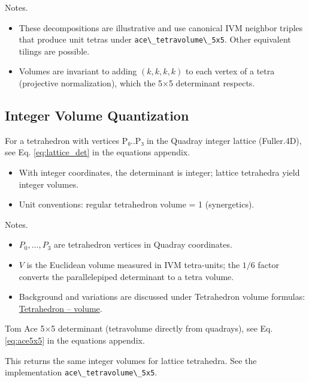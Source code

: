 \documentclass[
  10pt,
]{article}
\newcommand{\passthrough}[1]{#1}
\providecommand{\tightlist}{%
  \setlength{\itemsep}{0pt}\setlength{\parskip}{0pt}}
\begin{document}
Notes.

\begin{itemize}
\tightlist
\item
  These decompositions are illustrative and use canonical IVM neighbor
  triples that produce unit tetras under
  \passthrough{\lstinline!ace\_tetravolume\_5x5!}. Other equivalent
  tilings are possible.
\item
  Volumes are invariant to adding \((k,k,k,k)\) to each vertex of a
  tetra (projective normalization), which the 5×5 determinant respects.
\end{itemize}

\hypertarget{sec:integer_volume}{%
\subsection{Integer Volume Quantization}\label{sec:integer_volume}}

For a tetrahedron with vertices P₀..P₃ in the Quadray integer lattice
(Fuller.4D), see Eq. \eqref{eq:lattice_det} in the equations appendix.

\begin{itemize}
\tightlist
\item
  With integer coordinates, the determinant is integer; lattice
  tetrahedra yield integer volumes.
\item
  Unit conventions: regular tetrahedron volume = 1 (synergetics).
\end{itemize}

Notes.

\begin{itemize}
\tightlist
\item
  \(P_0,\ldots,P_3\) are tetrahedron vertices in Quadray coordinates.
\item
  \(V\) is the Euclidean volume measured in IVM tetra-units; the \(1/6\)
  factor converts the parallelepiped determinant to a tetra volume.
\item
  Background and variations are discussed under Tetrahedron volume
  formulas:
  \href{https://en.wikipedia.org/wiki/Tetrahedron\#Volume}{Tetrahedron
  -- volume}.
\end{itemize}

Tom Ace 5×5 determinant (tetravolume directly from quadrays), see Eq.
\eqref{eq:ace5x5} in the equations appendix.

This returns the same integer volumes for lattice tetrahedra. See the
implementation \passthrough{\lstinline!ace\_tetravolume\_5x5!}.
\end{document}
